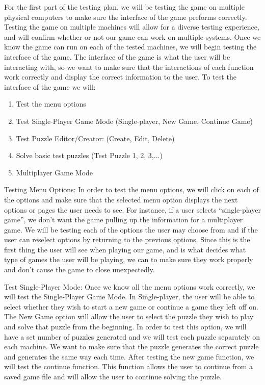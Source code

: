 \documentclass[12pt]{article}
\begin{document}
For the first part of the testing plan, we will be testing the game on multiple physical computers to make sure the interface of the game preforms correctly. Testing the game on multiple machines will allow for a diverse testing experience, and will confirm whether or not our game can work on multiple systems. Once we know the game can run on each of the tested machines, we will begin testing the interface of the game.
The interface of the game is what the user will be interacting with, so we want to make sure that the interactions of each function work correctly and display the correct information to the user. To test the interface of the game we will:

\begin{enumerate}
\item Test the menu options
\item Test Single-Player Game Mode (Single-player, New Game, Continue Game)
\item Test Puzzle Editor/Creator: (Create, Edit, Delete)
\item Solve basic test puzzles (Test Puzzle 1, 2, 3,...)
\item Multiplayer Game Mode
\end{enumerate}

Testing Menu Options:
In order to test the menu options, we will click on each of the options and make sure that the selected menu option displays the next options or pages the user needs to see. For instance, if a user selects “single-player game”, we don't want the game pulling up the information for a multiplayer game.
We will be testing each of the options the user may choose from and if the user can reselect options by returning to the previous options. Since this is the first thing the user will see when playing our game, and is what decides what type of games the user will be playing, we can to make sure they work properly and don't cause the game to close unexpectedly.

Test Single-Player Mode:
Once we know all the menu options work correctly, we will test the Single-Player Game Mode. In Single-player, the user will be able to select whether they wish to start a new game or continue a game they left off on. The New Game option will allow the user to select the puzzle they wish to play and solve that puzzle from the beginning. In order to test this option, we will have a set number of puzzles generated and we will test each puzzle separately on each machine. We want to make sure that the puzzle generates the correct puzzle and generates the same way each time. After testing the new game function, we will test the continue function. This function allows the user to continue from a saved game file and will allow the user to continue solving the puzzle.
\end{document}
